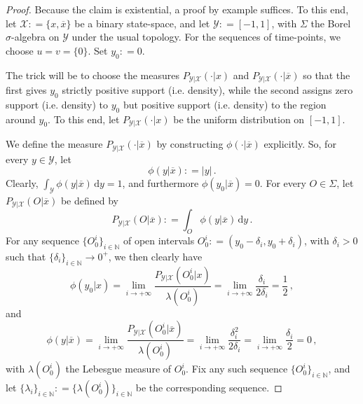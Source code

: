 \documentclass[twoside,11pt]{article}
\newcommand{\nats}{\mathbb{N}}
\newcommand{\states}{\mathcal{X}}
\newcommand{\observs}{\mathcal{Y}}
\newcommand{\abs}[1]{\left\vert #1 \right\vert}
\newcommand{\coloneqq}{:\!=}
\begin{document}
\begin{proof}
Because the claim is existential, a proof by example suffices. To this end, let $\states\coloneqq\{x,\overline{x}\}$ be a binary state-space, and let $\observs\coloneqq [-1,1]$, with $\Sigma$ the Borel $\sigma$-algebra on $\observs$ under the usual topology. For the sequences of time-points, we choose $u=v=\{0\}$. Set $y_0\coloneqq 0$.

The trick will be to choose the measures $P_{\observs\vert\states}(\cdot\vert x)$ and $P_{\observs\vert\states}(\cdot\vert \overline{x})$ so that the first gives $y_0$ strictly positive support (i.e. density), while the second assigns zero support (i.e. density) to $y_0$ but positive support (i.e. density) to the region around $y_0$. To this end, let $P_{\observs\vert\states}(\cdot\vert x)$ be the uniform distribution on $[-1,1]$.

We define the measure $P_{\observs\vert\states}(\cdot\vert \overline{x})$ by constructing $\phi(\cdot\vert\overline{x})$ explicitly. So, for every $y\in\observs$, let
\begin{equation*}
\phi(y\vert\overline{x}) \coloneqq \abs{y}\,.
\end{equation*}
Clearly, $\int_\observs \phi(y\vert\overline{x})\,\mathrm{d}y = 1$, and furthermore $\phi(y_0\vert\overline{x})=0$. For every $O\in\Sigma$, let $P_{\observs\vert\states}(O\vert\overline{x})$ be defined by
\begin{equation*}
P_{\observs\vert\states}(O\vert\overline{x}) \coloneqq \int_O\phi(y\vert\overline{x})\,\mathrm{d}y\,.
\end{equation*}
For any sequence $\{O_0^i\}_{i\in\nats}$ of open intervals $O_0^i\coloneqq (y_0-\delta_i,y_0+\delta_i)$, with $\delta_i>0$ such that $\{\delta_i\}_{i\in\nats}\to0^+$, we then clearly have
\begin{equation*}
\phi(y_0\vert x) = \lim_{i\to+\infty} \frac{P_{\observs\vert\states}(O_0^i\vert x)}{\lambda(O_0^i)} = \lim_{i\to+\infty} \frac{\delta_i}{2\delta_i} = \frac{1}{2}\,,
\end{equation*}
and
\begin{equation*}
\phi(y\vert \overline{x}) = \lim_{i\to+\infty} \frac{P_{\observs\vert\states}(O_0^i\vert \overline{x})}{\lambda(O_0^i)} = \lim_{i\to+\infty} \frac{\delta_i^2}{2\delta_i} = \lim_{i\to+\infty} \frac{\delta_i}{2} = 0\,,
\end{equation*}
with $\lambda(O_0^i)$ the Lebesgue measure of $O_0^i$. Fix any such sequence $\{O_0^i\}_{i\in\nats}$, and let $\{\lambda_i\}_{i\in\nats}\coloneqq\{\lambda(O_0^i)\}_{i\in\nats}$ be the corresponding sequence.


\end{proof}
\end{document}
